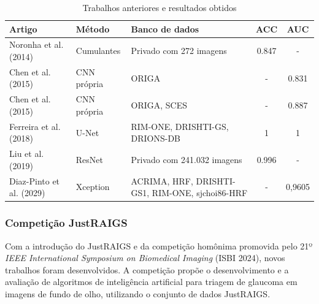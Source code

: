 \documentclass[12pt]{article}
\begin{document}
\begin{table}[htb]
    \centering
    \small
    \renewcommand{\arraystretch}{1.2}
    \begin{tabularx}{\textwidth}{>{\raggedright\arraybackslash}p{3cm}l>{\raggedright\arraybackslash}Xcc}
    \toprule
    \textbf{Artigo} & \textbf{Método} & \textbf{Banco de dados} & \textbf{ACC} & \textbf{AUC} \\
    \midrule
    Noronha et al. (2014)~\cite{noronha2014hoc} & Cumulantes  & Privado com 272 imagens        & 0.847 &  -    \\

    Chen et al. (2015)~\cite{chen2015cnn}       & CNN própria & ORIGA                          & -     & 0.831 \\

    Chen et al. (2015)~\cite{chen2015cnn}       & CNN própria & ORIGA, SCES                    & -     & 0.887 \\

    Ferreira et al. (2018)~\cite{ferreira_cnn_2018} & U-Net   & RIM-ONE, DRISHTI-GS, DRIONS-DB & 1     & 1     \\

    Liu et al. (2019)~\cite{liu_cnn_2019}       & ResNet      & Privado com 241.032 imagens    & 0.996 & -     \\

    Diaz-Pinto et al. (2029)~\cite{liu_cnn_2019} & Xception & ACRIMA, HRF, DRISHTI-GS1, RIM-ONE, sjchoi86-HRF & - & 0,9605 \\

    \bottomrule
    \end{tabularx}
    \renewcommand{\arraystretch}{1}
    \caption{Trabalhos anteriores e resultados obtidos}
    \label{tab:trabalhos}
\end{table}


\subsubsection{Competição JustRAIGS}
\label{sec:review:related:justraigs}

Com a introdução do JustRAIGS e da competição homônima promovida pelo 21º \textit{IEEE International Symposium on Biomedical Imaging} (ISBI 2024), novos trabalhos foram desenvolvidos. A competição propõe o desenvolvimento e a avaliação de algoritmos de inteligência artificial para triagem de glaucoma em imagens de fundo de olho, utilizando o conjunto de dados JustRAIGS.
\end{document}
